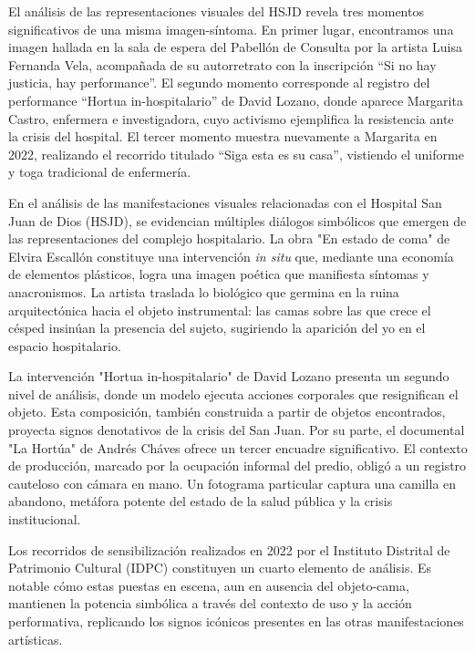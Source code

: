 El análisis de las representaciones visuales del HSJD revela tres momentos significativos de una misma imagen-síntoma. En primer lugar, encontramos una imagen hallada en la sala de espera del Pabellón de Consulta por la artista Luisa Fernanda Vela, acompañada de su autorretrato con la inscripción \enquote{Si no hay justicia, hay performance}. El segundo momento corresponde al registro del performance \enquote{Hortua in-hospitalario} de David Lozano, donde aparece Margarita Castro, enfermera e investigadora, cuyo activismo ejemplifica la resistencia ante la crisis del hospital. El tercer momento muestra nuevamente a Margarita en 2022, realizando el recorrido titulado \enquote{Siga esta es su casa}, vistiendo el uniforme y toga tradicional de enfermería.


En el análisis de las manifestaciones visuales relacionadas con el Hospital San Juan de Dios (HSJD), se evidencian múltiples diálogos simbólicos que emergen de las representaciones del complejo hospitalario. La obra "En estado de coma" de Elvira Escallón constituye una intervención \textit{in situ} que, mediante una economía de elementos plásticos, logra una imagen poética que manifiesta síntomas y anacronismos. La artista traslada lo biológico que germina en la ruina arquitectónica hacia el objeto instrumental: las camas sobre las que crece el césped insinúan la presencia del sujeto, sugiriendo la aparición del yo en el espacio hospitalario.

La intervención "Hortua in-hospitalario" de David Lozano presenta un segundo nivel de análisis, donde un modelo ejecuta acciones corporales que resignifican el objeto. Esta composición, también construida a partir de objetos encontrados, proyecta signos denotativos de la crisis del San Juan. Por su parte, el documental "La Hortúa" de Andrés Cháves ofrece un tercer encuadre significativo. El contexto de producción, marcado por la ocupación informal del predio, obligó a un registro cauteloso con cámara en mano. Un fotograma particular captura una camilla en abandono, metáfora potente del estado de la salud pública y la crisis institucional.

Los recorridos de sensibilización realizados en 2022 por el Instituto Distrital de Patrimonio Cultural (IDPC) constituyen un cuarto elemento de análisis. Es notable cómo estas puestas en escena, aun en ausencia del objeto-cama, mantienen la potencia simbólica a través del contexto de uso y la acción performativa, replicando los signos icónicos presentes en las otras manifestaciones artísticas.

